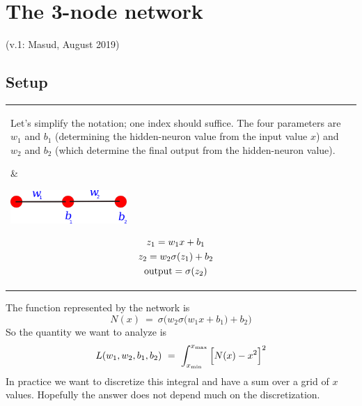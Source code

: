 \documentclass[12pt,a4paper]{article}
\begin{document}
\newpage 


\section{The 3-node network}

(v.1: Masud, August 2019)

\subsection{Setup}



\begin{center}
\begin{tabular}{l|l}
%
\parbox{0.48\textwidth}{ 
%
\raggedright
  
Let's simplify the notation; one index should suffice.  The four parameters are $w_1$ and $b_1$
(determining the hidden-neuron value from the input value $x$) and $w_2$ and $b_2$ (which determine the
final output from the hidden-neuron value).
  


} &   \hspace{-0.01\textwidth}
\parbox{0.42\textwidth}{ \flushleft


\begin{center}
\includegraphics[width=0.35\textwidth]{Images/notation_3node_a_01}
\end{center}

\begin{gather*}
  z_1 = w_1x + b_1
  \\
  z_2 = w_2\sigma(z_1) + b_2
  \\
  {\rm output} = \sigma(z_2)
\end{gather*}


} 
\\
\end{tabular}
\end{center}



The function represented by the network is
\begin{equation}
N(x) ~=~  \sigma\Big( w_2 \sigma\big(w_1x+b_1\big) +b_2 \Big)
\end{equation}
So the quantity we want to analyze is
\begin{equation}
L(w_1,w_2,b_1,b_2) ~=~  \int_{x_{\rm min}}^{x_{\rm max}} \Big[ N(x) -x^2 \Big]^2 
\end{equation}
In practice we want to discretize this integral and have a sum over a grid of $x$ values.  Hopefully
the answer does not depend much on the discretization.  
\end{document}
